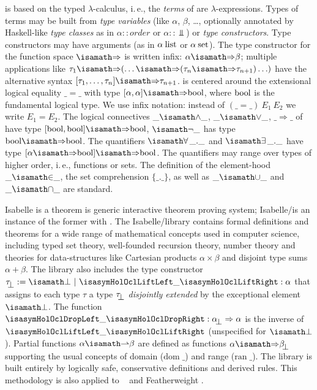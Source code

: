 \documentclass[11pt,a4paper,openright,twoside,abstracton]{scrreprt}
\renewcommand{\to}{\Rightarrow}
\newcommand{\ran}{\mathrm{ran}}
\newcommand{\dom}{\mathrm{dom}}
\newcommand{\ie}{i.\,e.\xspace}
\begin{document}
\HOL is based on the typed $\lambda$-calculus, \ie, the \emph{terms} of \HOL are
$\lambda$-expressions.  Types of terms may be built from \emph{type
  variables} (like $\alpha$, $\beta$, \ldots, optionally
annotated by Haskell-like \emph{type classes} as in
$\alpha::order$ or $\alpha::\Bot$) or \emph{type constructors}. Type constructors may have arguments (as in $\alpha\:\mathrm{list}$
or $\alpha\:\mathrm{set}$). The type constructor for the function space
$\isasymRightarrow$ is written infix: $\alpha \isasymRightarrow \beta$; multiple
applications like
$\tau_1\isasymRightarrow(\ldots\isasymRightarrow(\tau_n\isasymRightarrow\tau_{n+1})\ldots)$
have the alternative syntax $[\tau_1, \ldots, \tau_n] \isasymRightarrow
\tau_{n+1}$. \HOL is centered around the extensional logical equality $\_=\_$
with type $[\alpha, \alpha] \isasymRightarrow \HolBoolean$, where $\mathrm{bool}$
is the fundamental logical type.  We use infix notation: instead of
$(\_=\_)~E_1~E_2$ we write $E_1=E_2$. The logical connectives $\_\isasymand\_$,
$\_\isasymor\_$, $\_\to\_$ of \HOL have type $[\HolBoolean, \HolBoolean]
\isasymRightarrow \HolBoolean$, $\isasymnot\_$ has type $\HolBoolean
\isasymRightarrow \HolBoolean$. The quantifiers $\isasymforall\_.\_$ and
$\isasymexists\_.\_$ have type $[\alpha \isasymRightarrow \HolBoolean]
\isasymRightarrow \HolBoolean$. The quantifiers may range over types of higher
order, \ie, functions or sets. 
The definition of the element-hood $\_\isasymin\_$, the set comprehension
$\{\_.\_\}$, as well as $\_\isasymunion\_$ and $\_\isasyminter\_$ are standard.

Isabelle is a theorem is generic interactive theorem proving system;
Isabelle/\HOL is an instance of the former with \HOL.  The
Isabelle/\HOL library contains formal definitions and theorems for a
wide range of mathematical concepts used in computer science,
including typed set theory, well-founded recursion theory, number
theory and theories for data-structures like Cartesian products
$\alpha \times \beta$ and disjoint type sums $\alpha + \beta$.  The
library also includes the type constructor $\up{\tau} := \isasymbottom
~ | ~ \lift{\_} : \alpha$ that assigns to each type $\tau$ a type
$\up{\tau}$ \emph{disjointly extended} by the exceptional element
$\isasymbottom$. The function $\drop{\_}
: \up{\alpha} \to \alpha$ is the inverse of $\lift{\_}$ (unspecified
for $\isasymbottom$). Partial functions $\alpha \isasymrightharpoonup
\beta$ are defined as functions $\alpha \isasymRightarrow \up{\beta}$
supporting the usual concepts of domain ($\dom\;\_$) and range
($\ran\;\_$).  The library is built entirely by logically safe,
conservative definitions and derived rules.  This methodology is also
applied to \holocl~\cite{brucker.ea:hol-ocl:2008} and Featherweight
\OCL.
\end{document}
